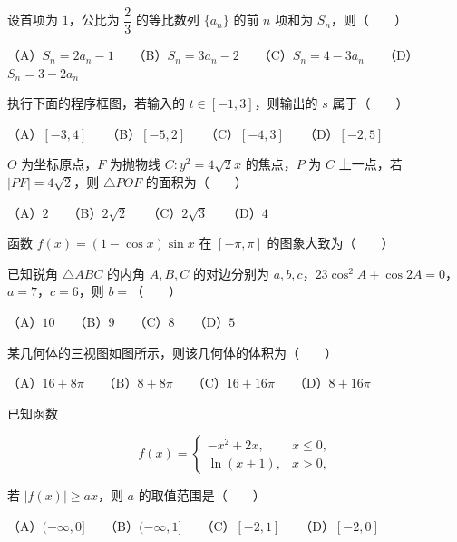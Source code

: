 \begin{question}
设首项为 $1$，公比为 $\dfrac23$ 的等比数列 $\{a_n\}$ 的前 $n$ 项和为 $S_n$，则\mbox{（　　）}

（A）$S_n=2a_n-1$　　（B）$S_n=3a_n-2$　　（C）$S_n=4-3a_n$　　（D）$S_n=3-2a_n$

\Needspace{0.4\textheight}
\end{question}
\begin{question}
执行下面的程序框图，若输入的 $t\in[-1,3]$，则输出的 $s$ 属于\mbox{（　　）}
\nopagebreak[4]
\begin{center}\end{center}
\nopagebreak[4]
（A）$[-3,4]$　　（B）$[-5,2]$　　（C）$[-4,3]$　　（D）$[-2,5]$

\end{question}
\begin{question}
$O$ 为坐标原点，$F$ 为抛物线 $C:y^2=4\sqrt2x$ 的焦点，$P$ 为 $C$ 上一点，若 $|PF|=4\sqrt2$，则 $\triangle POF$ 的面积为\mbox{（　　）}

（A）$2$　　（B）$2\sqrt2$　　（C）$2\sqrt3$　　（D）$4$

\Needspace{0.4\textheight}
\end{question}
\begin{question}
函数 $f(x)=(1-\cos x)\sin x$ 在 $[-\pi,\pi]$ 的图象大致为\mbox{（　　）}
\nopagebreak[4]
\begin{center}\end{center}
\nopagebreak[4]
\end{question}
\begin{question}
已知锐角 $\triangle ABC$ 的内角 $A,B,C$ 的对边分别为 $a,b,c$，$23\cos^2A+\cos2A=0$，$a=7$，$c=6$，则 $b=$\mbox{（　　）}

（A）$10$　　（B）$9$　　（C）$8$　　（D）$5$

\Needspace{0.4\textheight}
\end{question}
\begin{question}
某几何体的三视图如图所示，则该几何体的体积为\mbox{（　　）}
\nopagebreak[4]
\begin{center}\end{center}
\nopagebreak[4]
（A）$16+8\pi$　　（B）$8+8\pi$　　（C）$16+16\pi$　　（D）$8+16\pi$

\end{question}
\begin{question}
已知函数

\nopagebreak[4]
\[
f(x)=\begin{cases}
-x^2+2x,&x\leqslant0,\\
\ln(x+1),&x>0,
\end{cases}
\]

若 $|f(x)|\geqslant ax$，则 $a$ 的取值范围是\mbox{（　　）}

（A）$(-\infty,0]$　　（B）$(-\infty,1]$　　（C）$[-2,1]$　　（D）$[-2,0]$

\end{question}

